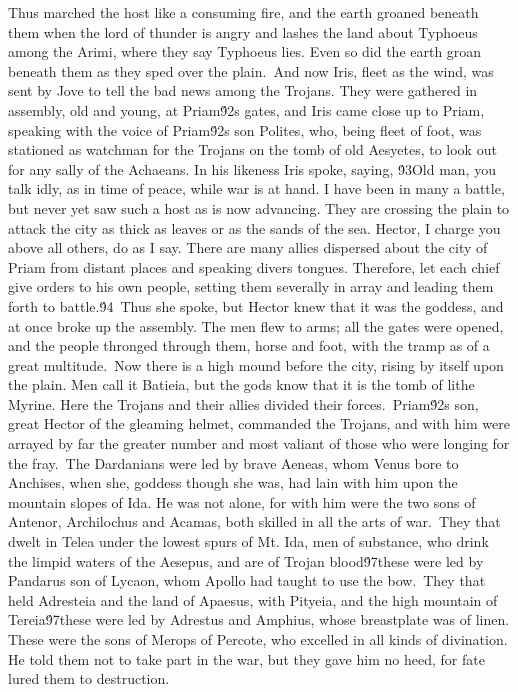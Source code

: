 {Thus marched the host like a consuming fire, and the earth groaned beneath them when the lord of thunder is angry and lashes the land about Typhoeus among the Arimi, where they say Typhoeus lies. Even so did the earth groan beneath them as they sped over the plain.\
And now Iris, fleet as the wind, was sent by Jove to tell the bad news among the Trojans. They were gathered in assembly, old and young, at Priam\'92s gates, and Iris came close up to Priam, speaking with the voice of Priam\'92s son Polites, who, being fleet of foot, was stationed as watchman for the Trojans on the tomb of old Aesyetes, to look out for any sally of the Achaeans. In his likeness Iris spoke, saying, \'93Old man, you talk idly, as in time of peace, while war is at hand. I have been in many a battle, but never yet saw such a host as is now advancing. They are crossing the plain to attack the city as thick as leaves or as the sands of the sea. Hector, I charge you above all others, do as I say. There are many allies dispersed about the city of Priam from distant places and speaking divers tongues. Therefore, let each chief give orders to his own people, setting them severally in array and leading them forth to battle.\'94\
Thus she spoke, but Hector knew that it was the goddess, and at once broke up the assembly. The men flew to arms; all the gates were opened, and the people thronged through them, horse and foot, with the tramp as of a great multitude.\
Now there is a high mound before the city, rising by itself upon the plain. Men call it Batieia, but the gods know that it is the tomb of lithe Myrine. Here the Trojans and their allies divided their forces.\
Priam\'92s son, great Hector of the gleaming helmet, commanded the Trojans, and with him were arrayed by far the greater number and most valiant of those who were longing for the fray.\
The Dardanians were led by brave Aeneas, whom Venus bore to Anchises, when she, goddess though she was, had lain with him upon the mountain slopes of Ida. He was not alone, for with him were the two sons of Antenor, Archilochus and Acamas, both skilled in all the arts of war.\
They that dwelt in Telea under the lowest spurs of Mt. Ida, men of substance, who drink the limpid waters of the Aesepus, and are of Trojan blood\'97these were led by Pandarus son of Lycaon, whom Apollo had taught to use the bow.\
They that held Adresteia and the land of Apaesus, with Pityeia, and the high mountain of Tereia\'97these were led by Adrestus and Amphius, whose breastplate was of linen. These were the sons of Merops of Percote, who excelled in all kinds of divination. He told them not to take part in the war, but they gave him no heed, for fate lured them to destruction.\
}
